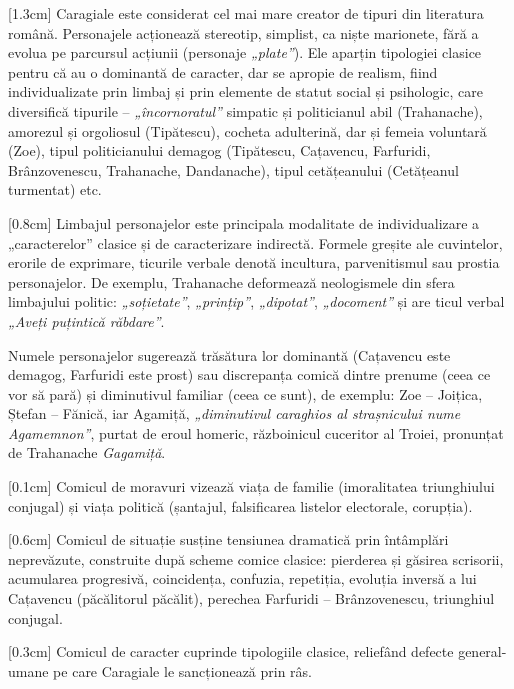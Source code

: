 [1.3cm]
Caragiale este considerat cel mai mare creator de tipuri din literatura română. Personajele acționează stereotip, simplist, ca niște marionete, fără a evolua pe parcursul acțiunii (personaje \textit{„plate”}). Ele aparțin tipologiei clasice pentru că au o dominantă de caracter, dar se apropie de realism, fiind individualizate prin limbaj și prin elemente de statut social și psihologic, care diversifică tipurile -- \textit{„încornoratul”} simpatic și politicianul abil (Trahanache), amorezul și orgoliosul (Tipătescu), cocheta adulterină, dar și femeia voluntară (Zoe), tipul politicianului demagog (Tipătescu, Cațavencu, Farfuridi, Brânzovenescu, Trahanache, Dandanache), tipul cetățeanului (Cetățeanul turmentat) etc.

[0.8cm]
Limbajul personajelor este principala modalitate de individualizare a „caracterelor” clasice și de caracterizare indirectă. Formele greșite ale cuvintelor, erorile de exprimare, ticurile verbale denotă incultura, parvenitismul sau prostia personajelor. De exemplu, Trahanache deformează neologismele din sfera limbajului politic: \textit{„soțietate”}, \textit{„prințip”}, \textit{„dipotat”}, \textit{„docoment”} și are ticul verbal \textit{„Aveți puțintică răbdare”}.

Numele personajelor sugerează trăsătura lor dominantă (Cațavencu este demagog, Farfuridi este prost) sau discrepanța comică dintre prenume (ceea ce vor să pară) și diminutivul familiar (ceea ce sunt), de exemplu: Zoe -- Joițica, Ștefan -- Fănică, iar Agamiță, \textit{„diminutivul caraghios al strașnicului nume Agamemnon”}, purtat de eroul homeric, războinicul cuceritor al Troiei, pronunțat de Trahanache \textit{Gagamiță}.

[0.1cm]
Comicul de moravuri vizează viața de familie (imoralitatea triunghiului conjugal) și viața politică (șantajul, falsificarea listelor electorale, corupția).

[0.6cm]
Comicul de situație susține tensiunea dramatică prin întâmplări neprevăzute, construite după scheme comice clasice: pierderea și găsirea scrisorii, acumularea progresivă, coincidența, confuzia, repetiția, evoluția inversă a lui Cațavencu (păcălitorul păcălit), perechea Farfuridi -- Brânzovenescu, triunghiul conjugal.

[0.3cm]
Comicul de caracter cuprinde tipologiile clasice, reliefând defecte general-umane pe care Caragiale le sancționează prin râs.

